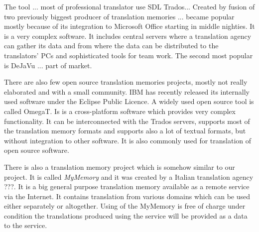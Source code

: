 The tool ... most of professional translator use SDL Trados... Created by fusion of two previously biggest producer of translation memories ... became popular mostly because of its integration to Microsoft Office starting in middle nighties. It is a very complex software. It includes central servers where a translation agency can gather its data and from where the data can be distributed to the translators' PCs and sophisticated tools for team work. The second most popular is DeJaVu ... part of market.

There are also few open source translation memories projects, mostly not really elaborated and with a small community. IBM has recently released its internally used software under the Eclipse Public Licence. A widely used open source tool is called OmegaT. Is is a cross-platform software which provides very complex functionality. It can be interconnected with the Trados servers, supports most of the translation memory formats and supports also a lot of textual formats, but without integration to other software. It is also commonly used for translation of open source software.

There is also a translation memory project which is somehow similar to our project. It is called \emph{MyMemory} and it was created by a Italian translation agency ???. It is a big general purpose translation memory available as a remote service via the Internet. It contains translation from various domains which can be used either separately or altogether. Using of the MyMemory is free of charge under condition the translations produced using the service will be provided as a data to the service.